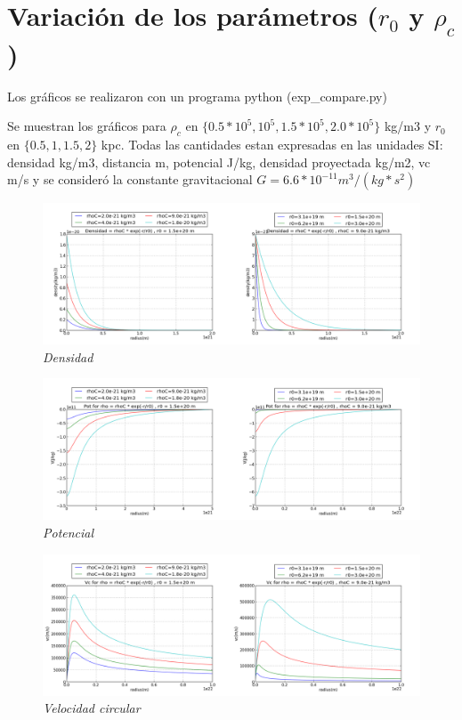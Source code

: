 \documentclass[12pt]{book}
\begin{document}
\clearpage

\section*{Variación de los parámetros ($r_0$ y $\rho_c$)}

\begin{description}
\item Los gráficos se realizaron con un programa python (exp\_compare.py) 
\item Se muestran los gráficos  para $\rho_c$ en $ \{0.5 * 10^5, 10^5, 1.5 * 10^5, 2.0 * 10^5 \}  $ kg/m3 y $r_0$ en $\{0.5 , 1, 1.5  ,2 \} $ kpc. 
Todas las cantidades estan expresadas en las unidades SI: densidad kg/m3, distancia m, potencial J/kg, densidad proyectada kg/m2, vc m/s y se consideró la constante gravitacional $G = 6.6 * 10^{-11} m^3/(kg * s^2)$

\end{description}



\begin{figure}[!ht]
 \centering
 \includegraphics[scale=0.33]{densFinal.png}
 \caption{\emph{Densidad}}
\end{figure}


\begin{figure}[!ht]
 \centering
 \includegraphics[scale=0.33]{potFinal.png}
 \caption{\emph{Potencial}}
\end{figure}


\begin{figure}[!ht]
 \centering
 \includegraphics[scale=0.33]{vcFinal.png}
 \caption{\emph{Velocidad circular}}
\end{figure}
\end{document}
